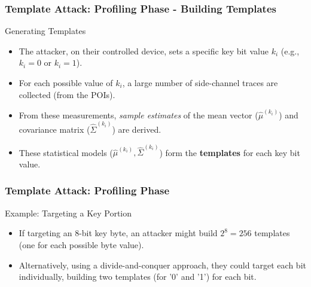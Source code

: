 \begin{frame}
    \frametitle{Template Attack: Profiling Phase - Building Templates} 
    \begin{block}{Generating Templates}
        \begin{itemize}
            \item The attacker, on their controlled device, sets a specific key bit value $k_i$ (e.g., $k_i=0$ or $k_i=1$).
            \item For each possible value of $k_i$, a large number of side-channel traces are collected (from the POIs).
            \item From these measurements, \textit{sample estimates} of the mean vector ($\hat{\mu}^{(k_i)}$) and covariance matrix ($\hat{\Sigma}^{(k_i)}$) are derived.
            \item These statistical models ($\hat{\mu}^{(k_i)}, \hat{\Sigma}^{(k_i)}$) form the \textbf{templates} for each key bit value.
        \end{itemize}
    \end{block}
\end{frame}


\begin{frame}
    \frametitle{Template Attack: Profiling Phase}
    \begin{block}{Example: Targeting a Key Portion}
        \begin{itemize}
            \item If targeting an 8-bit key byte, an attacker might build $2^8 = 256$ templates (one for each possible byte value).
            \item Alternatively, using a divide-and-conquer approach, they could target each bit individually, building two templates (for '0' and '1') for each bit.
        \end{itemize}
    \end{block}
\end{frame}

